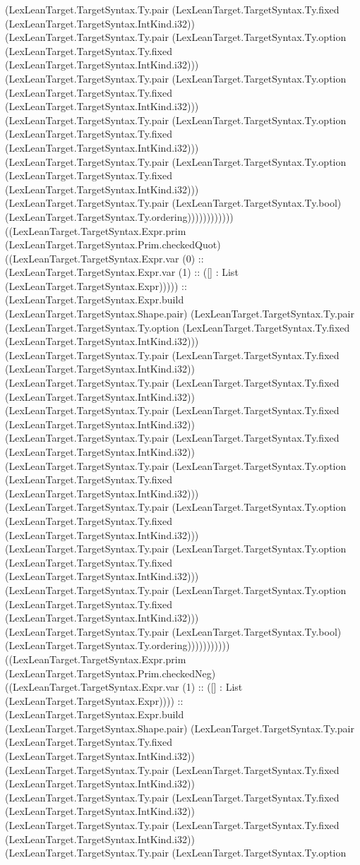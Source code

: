 \documentclass[11pt]{article}
\begin{document}
(LexLeanTarget.TargetSyntax.Ty.pair (LexLeanTarget.TargetSyntax.Ty.fixed (LexLeanTarget.TargetSyntax.IntKind.i32)) (LexLeanTarget.TargetSyntax.Ty.pair (LexLeanTarget.TargetSyntax.Ty.option (LexLeanTarget.TargetSyntax.Ty.fixed (LexLeanTarget.TargetSyntax.IntKind.i32))) (LexLeanTarget.TargetSyntax.Ty.pair (LexLeanTarget.TargetSyntax.Ty.option (LexLeanTarget.TargetSyntax.Ty.fixed (LexLeanTarget.TargetSyntax.IntKind.i32))) (LexLeanTarget.TargetSyntax.Ty.pair (LexLeanTarget.TargetSyntax.Ty.option (LexLeanTarget.TargetSyntax.Ty.fixed (LexLeanTarget.TargetSyntax.IntKind.i32))) (LexLeanTarget.TargetSyntax.Ty.pair (LexLeanTarget.TargetSyntax.Ty.option (LexLeanTarget.TargetSyntax.Ty.fixed (LexLeanTarget.TargetSyntax.IntKind.i32))) (LexLeanTarget.TargetSyntax.Ty.pair (LexLeanTarget.TargetSyntax.Ty.bool) (LexLeanTarget.TargetSyntax.Ty.ordering)))))))))))) ((LexLeanTarget.TargetSyntax.Expr.prim (LexLeanTarget.TargetSyntax.Prim.checkedQuot) ((LexLeanTarget.TargetSyntax.Expr.var (0) :: (LexLeanTarget.TargetSyntax.Expr.var (1) :: ([] : List (LexLeanTarget.TargetSyntax.Expr))))) :: (LexLeanTarget.TargetSyntax.Expr.build (LexLeanTarget.TargetSyntax.Shape.pair) (LexLeanTarget.TargetSyntax.Ty.pair (LexLeanTarget.TargetSyntax.Ty.option (LexLeanTarget.TargetSyntax.Ty.fixed (LexLeanTarget.TargetSyntax.IntKind.i32))) (LexLeanTarget.TargetSyntax.Ty.pair (LexLeanTarget.TargetSyntax.Ty.fixed (LexLeanTarget.TargetSyntax.IntKind.i32)) (LexLeanTarget.TargetSyntax.Ty.pair (LexLeanTarget.TargetSyntax.Ty.fixed (LexLeanTarget.TargetSyntax.IntKind.i32)) (LexLeanTarget.TargetSyntax.Ty.pair (LexLeanTarget.TargetSyntax.Ty.fixed (LexLeanTarget.TargetSyntax.IntKind.i32)) (LexLeanTarget.TargetSyntax.Ty.pair (LexLeanTarget.TargetSyntax.Ty.fixed (LexLeanTarget.TargetSyntax.IntKind.i32)) (LexLeanTarget.TargetSyntax.Ty.pair (LexLeanTarget.TargetSyntax.Ty.option (LexLeanTarget.TargetSyntax.Ty.fixed (LexLeanTarget.TargetSyntax.IntKind.i32))) (LexLeanTarget.TargetSyntax.Ty.pair (LexLeanTarget.TargetSyntax.Ty.option (LexLeanTarget.TargetSyntax.Ty.fixed (LexLeanTarget.TargetSyntax.IntKind.i32))) (LexLeanTarget.TargetSyntax.Ty.pair (LexLeanTarget.TargetSyntax.Ty.option (LexLeanTarget.TargetSyntax.Ty.fixed (LexLeanTarget.TargetSyntax.IntKind.i32))) (LexLeanTarget.TargetSyntax.Ty.pair (LexLeanTarget.TargetSyntax.Ty.option (LexLeanTarget.TargetSyntax.Ty.fixed (LexLeanTarget.TargetSyntax.IntKind.i32))) (LexLeanTarget.TargetSyntax.Ty.pair (LexLeanTarget.TargetSyntax.Ty.bool) (LexLeanTarget.TargetSyntax.Ty.ordering))))))))))) ((LexLeanTarget.TargetSyntax.Expr.prim (LexLeanTarget.TargetSyntax.Prim.checkedNeg) ((LexLeanTarget.TargetSyntax.Expr.var (1) :: ([] : List (LexLeanTarget.TargetSyntax.Expr)))) :: (LexLeanTarget.TargetSyntax.Expr.build (LexLeanTarget.TargetSyntax.Shape.pair) (LexLeanTarget.TargetSyntax.Ty.pair (LexLeanTarget.TargetSyntax.Ty.fixed (LexLeanTarget.TargetSyntax.IntKind.i32)) (LexLeanTarget.TargetSyntax.Ty.pair (LexLeanTarget.TargetSyntax.Ty.fixed (LexLeanTarget.TargetSyntax.IntKind.i32)) (LexLeanTarget.TargetSyntax.Ty.pair (LexLeanTarget.TargetSyntax.Ty.fixed (LexLeanTarget.TargetSyntax.IntKind.i32)) (LexLeanTarget.TargetSyntax.Ty.pair (LexLeanTarget.TargetSyntax.Ty.fixed (LexLeanTarget.TargetSyntax.IntKind.i32)) (LexLeanTarget.TargetSyntax.Ty.pair (LexLeanTarget.TargetSyntax.Ty.option 
\end{document}
